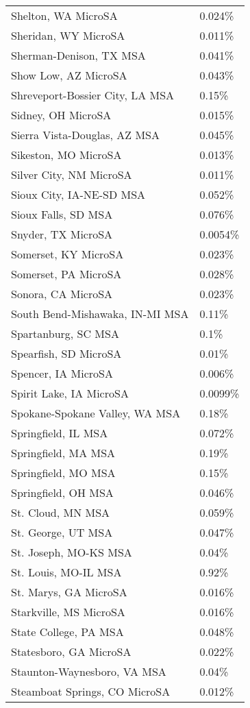 \begin{longtable}[]{@{}ll@{}}
Shelton, WA MicroSA & 0.024\% \\
Sheridan, WY MicroSA & 0.011\% \\
Sherman-Denison, TX MSA & 0.041\% \\
Show Low, AZ MicroSA & 0.043\% \\
Shreveport-Bossier City, LA MSA & 0.15\% \\
Sidney, OH MicroSA & 0.015\% \\
Sierra Vista-Douglas, AZ MSA & 0.045\% \\
Sikeston, MO MicroSA & 0.013\% \\
Silver City, NM MicroSA & 0.011\% \\
Sioux City, IA-NE-SD MSA & 0.052\% \\
Sioux Falls, SD MSA & 0.076\% \\
Snyder, TX MicroSA & 0.0054\% \\
Somerset, KY MicroSA & 0.023\% \\
Somerset, PA MicroSA & 0.028\% \\
Sonora, CA MicroSA & 0.023\% \\
South Bend-Mishawaka, IN-MI MSA & 0.11\% \\
Spartanburg, SC MSA & 0.1\% \\
Spearfish, SD MicroSA & 0.01\% \\
Spencer, IA MicroSA & 0.006\% \\
Spirit Lake, IA MicroSA & 0.0099\% \\
Spokane-Spokane Valley, WA MSA & 0.18\% \\
Springfield, IL MSA & 0.072\% \\
Springfield, MA MSA & 0.19\% \\
Springfield, MO MSA & 0.15\% \\
Springfield, OH MSA & 0.046\% \\
St. Cloud, MN MSA & 0.059\% \\
St. George, UT MSA & 0.047\% \\
St. Joseph, MO-KS MSA & 0.04\% \\
St. Louis, MO-IL MSA & 0.92\% \\
St. Marys, GA MicroSA & 0.016\% \\
Starkville, MS MicroSA & 0.016\% \\
State College, PA MSA & 0.048\% \\
Statesboro, GA MicroSA & 0.022\% \\
Staunton-Waynesboro, VA MSA & 0.04\% \\
Steamboat Springs, CO MicroSA & 0.012\% \\

\end{longtable}
